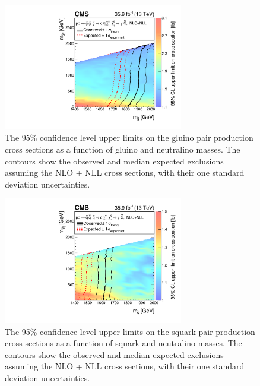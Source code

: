 \begin{figure}[h]
\begin{center}
\includegraphics[width=0.7\textwidth]{Figures/Results/T5ggXSEC.pdf}
\end{center}
    \caption[The 95\% confidence level upper limits on the gluino pair
        production cross sections as a function of gluino and neutralino masses.]
    {The 95\% confidence level upper limits on the gluino pair
        production cross sections as a function of gluino and neutralino masses.
        The contours show the observed and median expected exclusions assuming
        the NLO + NLL cross sections, with their one standard deviation
	uncertainties.}
    \label{fig:limit_T5gg}
\end{figure}

\begin{figure}[h]
\begin{center}
\includegraphics[width=0.7\textwidth]{Figures/Results/T6ggXSEC.pdf}
\end{center}
    \caption[The 95\% confidence level upper limits on the squark pair
        production cross sections as a function of squark and neutralino masses.]
    {The 95\% confidence level upper limits on the squark pair
        production cross sections as a function of squark and neutralino masses.
        The contours show the observed and median expected exclusions assuming
        the NLO + NLL cross sections, with their one standard deviation
	uncertainties.}
    \label{fig:limit_T6gg}
\end{figure}

